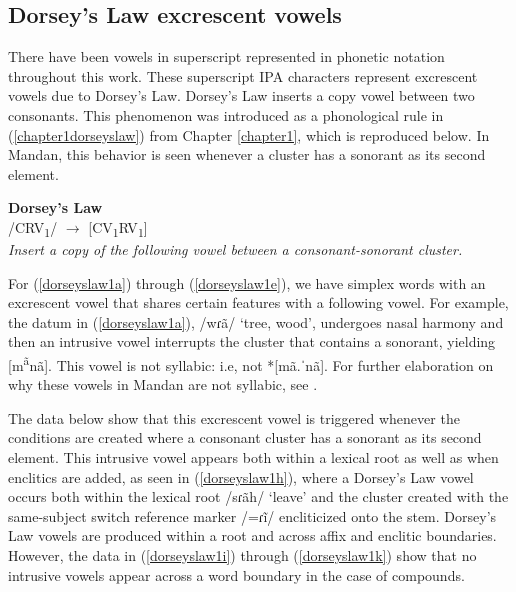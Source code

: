 \subsection{Dorsey's Law excrescent vowels}\label{dorseyslaw}

There have been vowels in superscript represented in phonetic notation throughout this work. These superscript IPA characters represent excrescent vowels due to Dorsey's Law. Dorsey's Law inserts a copy vowel between two consonants. This phenomenon was introduced as a phonological rule in (\ref{chapter1dorseyslaw}) from Chapter \ref{chapter1}, which is reproduced below. In Mandan, this behavior is seen whenever a cluster has a sonorant as its second element.

\begin{exe}

\item\label{chapter1dorseyslawREDUX} \textbf{Dorsey's Law}\\
/CRV\textsubscript{1}/ $\to$ [CV\textsubscript{1}RV\textsubscript{1}]\\
	\textit{Insert a copy of the following vowel between a consonant-sonorant cluster.}

\end{exe}

For (\ref{dorseyslaw1a}) through (\ref{dorseyslaw1e}), we have simplex words with an excrescent vowel that shares certain features with a following vowel. For example, the datum in (\ref{dorseyslaw1a}), /wɾã/ `tree, wood', undergoes nasal harmony and then an intrusive vowel interrupts the cluster that contains a sonorant, yielding [m\textsuperscript{ã}nã]. This vowel is not syllabic: i.e, not *[mã.ˈnã]. For further elaboration on why these vowels in Mandan are not syllabic, see .

The data below show that this excrescent vowel is triggered whenever the conditions are created where a consonant cluster has a sonorant as its second element. This intrusive vowel appears both within a lexical root as well as when enclitics are added, as seen in (\ref{dorseyslaw1h}), where a Dorsey's Law vowel occurs both within the lexical root /sɾãh/ `leave' and the cluster created with the same-subject switch reference marker /=ɾĩ/ encliticized onto the stem. Dorsey's Law vowels are produced within a root and across affix and enclitic boundaries. However, the data in (\ref{dorseyslaw1i}) through (\ref{dorseyslaw1k}) show that no intrusive vowels appear across a word boundary in the case of compounds.

